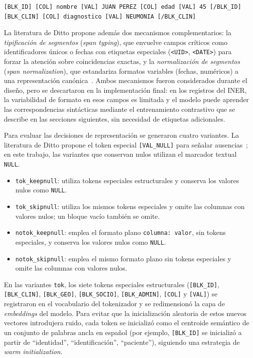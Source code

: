 \begin{verbatim}
[BLK_ID] [COL] nombre [VAL] JUAN PEREZ [COL] edad [VAL] 45 [/BLK_ID]
[BLK_CLIN] [COL] diagnostico [VAL] NEUMONIA [/BLK_CLIN]
\end{verbatim}



La literatura de Ditto propone además dos mecanismos complementarios: la \textit{tipificación de segmentos} (\textit{span typing}), que envuelve campos críticos como identificadores únicos o fechas con etiquetas especiales (\texttt{<UID>}, \texttt{<DATE>}) para forzar la atención sobre coincidencias exactas, y la \textit{normalización de segmentos} (\textit{span normalization}), que estandariza formatos variables (fechas, numéricos) a una representación canónica~\cite{li2020}. Ambos mecanismos fueron considerados durante el diseño, pero se descartaron en la implementación final: en los registros del INER, la variabilidad de formato en esos campos es limitada y el modelo puede aprender las correspondencias sintácticas mediante el entrenamiento contrastivo que se describe en las secciones siguientes, sin necesidad de etiquetas adicionales.

Para evaluar las decisiones de representación se generaron cuatro variantes. La literatura de Ditto propone el token especial \texttt{[VAL\_NULL]} para señalar ausencias~\cite{li2020}; en este trabajo, las variantes que conservan nulos utilizan el marcador textual \texttt{NULL}.
\begin{itemize}
    \item \texttt{tok\_keepnull}: utiliza tokens especiales estructurales y conserva los valores nulos como \texttt{NULL}.
    \item \texttt{tok\_skipnull}: utiliza los mismos tokens especiales y omite las columnas con valores nulos; un bloque vacío también se omite.
    \item \texttt{notok\_keepnull}: emplea el formato plano \texttt{columna: valor}, sin tokens especiales, y conserva los valores nulos como \texttt{NULL}.
    \item \texttt{notok\_skipnull}: emplea el mismo formato plano sin tokens especiales y omite las columnas con valores nulos.
\end{itemize}

En las variantes \texttt{tok}, los siete tokens especiales estructurales (\texttt{[BLK\_ID]}, \texttt{[BLK\_CLIN]}, \texttt{[BLK\_GEO]}, \texttt{[BLK\_SOCIO]}, \texttt{[BLK\_ADMIN]}, \texttt{[COL]} y \texttt{[VAL]}) se registraron en el vocabulario del tokenizador y se redimensionó la capa de \textit{embeddings} del modelo. Para evitar que la inicialización aleatoria de estos nuevos vectores introdujera ruido, cada token se inicializó como el centroide semántico de un conjunto de palabras ancla en español (por ejemplo, \texttt{[BLK\_ID]} se inicializó a partir de ``identidad'', ``identificación'', ``paciente''), siguiendo una estrategia de \textit{warm initialization}.

